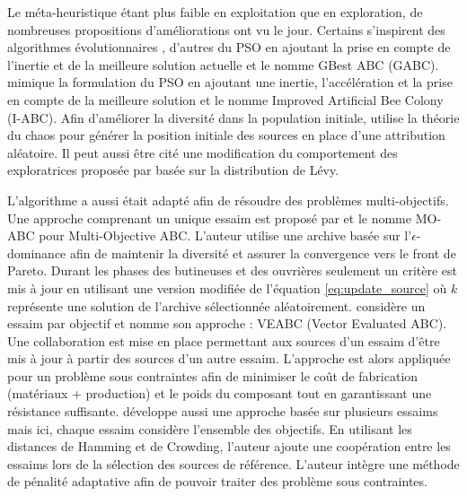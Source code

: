 Le méta-heuristique étant plus faible en exploitation que en exploration, de nombreuses
propositions d’améliorations ont vu le jour.
Certains s’inspirent des algorithmes évolutionnaires \parencite{Bi2011174,Zhao2010558},
d’autres du PSO \parencite{Zhu20103166} en ajoutant la prise en compte de l’inertie
et de la meilleure solution actuelle et le nomme GBest ABC (GABC). \cite{Li2012320}
mimique la formulation du PSO en ajoutant une inertie, l’accélération et la prise
en compte de la meilleure solution et le nomme Improved Artificial Bee Colony (I-ABC).
Afin d’améliorer la diversité dans la population initiale, \cite{Xiang20131256}
utilise la théorie du chaos pour générer la position initiale des sources en place
d’une attribution aléatoire. Il peut aussi être cité une modification du comportement
des exploratrices proposée par \cite{Sharma2012213} basée sur la distribution de
Lévy.

L’algorithme a aussi était adapté afin de résoudre des problèmes multi-objectifs.
Une approche comprenant un unique essaim est proposé par \cite{Akbari201239}
et le nomme MO-ABC pour Multi-Objective ABC.
L’auteur utilise une archive basée sur l’$\epsilon$-dominance afin de maintenir
la diversité et assurer la convergence vers le front de Pareto. Durant les phases
des butineuses et des ouvrières seulement un critère est mis à jour en utilisant
une version modifiée de l’équation \eqref{eq:update_source} où $k$ représente une
solution de l’archive sélectionnée aléatoirement.
\cite{Omkar2011489} considère un essaim par objectif et nomme son approche : VEABC  (Vector Evaluated ABC).
Une collaboration est mise en place permettant aux sources d’un essaim d’être mis
à jour à partir des sources d’un autre essaim. L’approche est alors appliquée pour un
problème sous contraintes afin de minimiser le coût de fabrication (matériaux + production)
et le poids du composant tout en garantissant une résistance suffisante.
\cite{Zhang20121} développe aussi une approche basée sur plusieurs essaims mais ici,
chaque essaim considère l’ensemble des objectifs. En utilisant les distances de Hamming
et de Crowding, l’auteur ajoute une coopération entre les essaims lors de la sélection
des sources de référence. L’auteur intègre une méthode de pénalité adaptative \parencite{Woldesenbet20073077}
afin de pouvoir traiter des problème sous contraintes.



